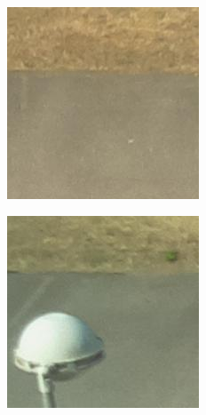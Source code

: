 \begin{figure}
\begin{subfigure}{0.25\columnwidth}
\includegraphics[width=\columnwidth]{38empty}%
\end{subfigure}%
\begin{subfigure}{0.25\columnwidth}%
\includegraphics[width=\columnwidth]{34empty}%

\end{subfigure}
\end{figure}
